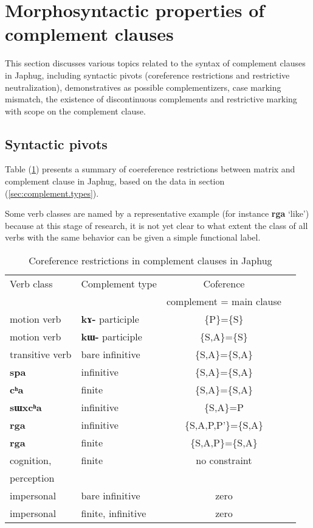 \documentclass[oneside,a4paper,11pt]{article}
\newcommand{\ipa}[1]{\textbf{\phon#1}} %
\newcommand{\jpg}[2]{\ipa{#1} `#2'} %
\begin{document}
\section{Morphosyntactic properties of complement clauses} 
This section discusses various topics related to the syntax of complement clauses in Japhug, including syntactic pivots (coreference restrictions and restrictive neutralization), demonstratives as possible complementizers, case marking mismatch, the existence of discontinuous complements and restrictive marking with scope on the complement clause.

 \subsection{Syntactic pivots} 
Table (\ref{tab:coref}) presents a summary of coereference restrictions between matrix and complement clause in Japhug, based on the data in section (\ref{sec:complement.types}).

Some verb classes are named by a representative example (for instance \jpg{rga}{like}) because at this stage of research, it is not yet clear to what extent the class of all verbs with the same behavior can be given a simple functional label.

\begin{table}[H]
\caption{Coreference restrictions in complement clauses in Japhug} \label{tab:coref} \centering
\begin{tabular}{llcc}
\toprule
Verb class & 	Complement type & 	Coference & 	\\
&& complement = main clause \\
\midrule
motion verb & 	\ipa{kɤ-} participle & 	\{P\}=\{S\} & 	\\
\midrule
motion verb & 	\ipa{kɯ-} participle & 	\{S,A\}=\{S\} & 	\\
transitive verb & 	bare infinitive & 	\{S,A\}=\{S,A\} & 	\\
\ipa{spa} & 	infinitive & 	\{S,A\}=\{S,A\} & 	\\
\ipa{cʰa} & 	finite & 	\{S,A\}=\{S,A\} & 	\\
\ipa{sɯxcʰa} & 	infinitive & 	\{S,A\}=P & 	\\
\midrule
\ipa{rga} & 	infinitive & 	\{S,A,P,P'\}=\{S,A\} & 	\\
\ipa{rga} & 	finite & 	\{S,A,P\}=\{S,A\} & 	\\
\midrule
cognition, & finite & no constraint \\
perception \\
impersonal & 	bare infinitive & 	zero & 	\\
impersonal & 	finite, infinitive & 	zero & 	\\
\bottomrule
\end{tabular}
\end{table}
\end{document}
